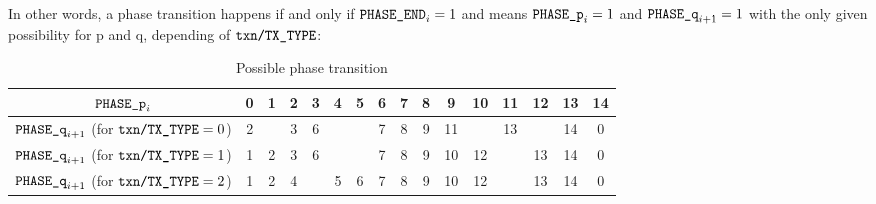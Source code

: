 In other words, a phase transition happens if and only if $\texttt{PHASE\_END}_{i} = 1$ and means $\texttt{PHASE\_p}_{i} = 1$ and $\texttt{PHASE\_q}_{i + 1} = 1$ with the only given possibility for p and q, depending of $\texttt{txn}\texttt{/}\texttt{{TX\_TYPE}}$:
\begin{table}[h]
    \centering
    \renewcommand{\arraystretch}{1.5}
    \begin{tabular}{|c|c|c|c|c|c|c|c|c|c|c|c|c|c|c|c|} \hline
        $\texttt{PHASE\_p}_{i}$                                                & 0 & 1 & 2 & 3 & 4 & 5 & 6 & 7 & 8 & 9  & 10 & 11 & 12 & 13 & 14 \\ \hline \hline
        $\texttt{PHASE\_q}_{i + 1}$ (for $\texttt{txn}\texttt{/}\texttt{{TX\_TYPE}} = 0$) & 2 &   & 3 & 6 &   &   & 7 & 8 & 9 & 11 &    & 13 &    & 14 & 0  \\ \hline
        $\texttt{PHASE\_q}_{i + 1}$ (for $\texttt{txn}\texttt{/}\texttt{{TX\_TYPE}} = 1$) & 1 & 2 & 3 & 6 &   &   & 7 & 8 & 9 & 10 & 12 &    & 13 & 14 & 0  \\ \hline
        $\texttt{PHASE\_q}_{i + 1}$ (for $\texttt{txn}\texttt{/}\texttt{{TX\_TYPE}} = 2$) & 1 & 2 & 4 &   & 5 & 6 & 7 & 8 & 9 & 10 & 12 &    & 13 & 14 & 0  \\ \hline
    \end{tabular}
    \caption{Possible phase transition}
    \label{tab:Possible phase transition}
\end{table}
